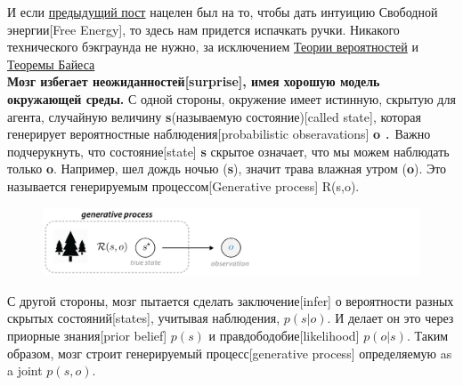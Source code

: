 \documentclass[twoside,leqno, 11pt]{article}
\begin{document}
	И если \href{https://medium.com/@solopchuk/intuitions-on-predictive-coding-and-the-free-energy-principle-3fc5bcedc754}{предыдущий пост} нацелен был на то, чтобы дать интуицию Свободной энергии[Free Energy], то здесь нам придется испачкать ручки. Никакого технического бэкграунда не нужно, за исключением \href{https://www.mathsisfun.com/data/probability.html}{Теории вероятностей} и \href{https://www.mathsisfun.com/data/bayes-theorem.html}{Теоремы Байеса}
\\

	\textbf{Мозг избегает неожиданностей[surprise], имея хорошую модель окружающей среды.} С одной стороны, окружение имеет истинную, скрытую для агента, случайную величину \textbf{s}(называемую состояние)[called state], которая генерирует вероятностные наблюдения[probabilistic obseravations] \textbf{o} ․ Важно подчерукнуть, что состояние[state] \textbf{s} скрытое означает, что мы можем наблюдать только \textbf{o}. Например, шел дождь ночью (\textbf{s}), значит трава влажная утром (\textbf{o}). Это называется генерируемым процессом[Generative process] R(s,o).

	\begin{figure}[h]
		\includegraphics[width=1\linewidth]{one}
		\label{ris:image}
	\end{figure}

	С другой стороны, мозг пытается сделать заключение[infer] о вероятности разных скрытых состояний[states], учитывая наблюдения, $p(s|o)$. И делает он это через приорные знания[prior belief] $p(s)$ и правдободобие[likelihood] $p(o|s)$. Таким образом, мозг строит генерируемый процесс[generative process] определяемую as a joint $p(s,o)$.

	\begin{figure}[h]
		\label{ris:image}
	\end{figure}
\end{document}
